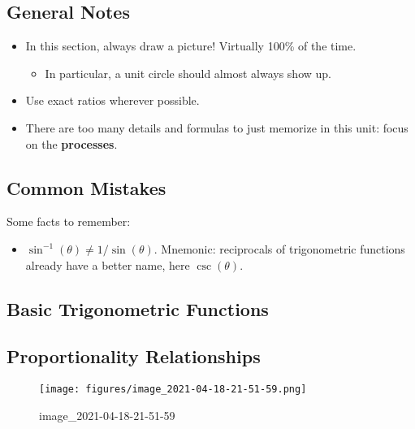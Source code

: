 \hypertarget{general-notes}{%
\subsection{General Notes}\label{general-notes}}

\begin{itemize}
\item
  In this section, always draw a picture! Virtually 100\% of the time.

  \begin{itemize}
  \tightlist
  \item
    In particular, a unit circle should almost always show up.
  \end{itemize}
\item
  Use exact ratios wherever possible.
\item
  There are too many details and formulas to just memorize in this unit:
  focus on the \textbf{processes}.
\end{itemize}

\hypertarget{common-mistakes}{%
\subsection{Common Mistakes}\label{common-mistakes}}

Some facts to remember:

\begin{itemize}
\tightlist
\item
  \(\sin^{-1}(\theta) \neq 1/\sin(\theta)\). Mnemonic: reciprocals of
  trigonometric functions already have a better name, here
  \(\csc(\theta)\).
\end{itemize}

\hypertarget{basic-trigonometric-functions}{%
\subsection{Basic Trigonometric
Functions}\label{basic-trigonometric-functions}}


\hypertarget{proportionality-relationships}{%
\subsection{Proportionality
Relationships}\label{proportionality-relationships}}

\begin{definition}[Radian]


\begin{figure}
\centering
\texttt{[image: figures/image\_2021-04-18-21-51-59.png]}
\caption{image\_2021-04-18-21-51-59}
\end{figure}

\end{definition}

